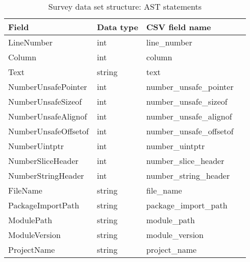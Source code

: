         \begin{table}[h]
            \centering
            \caption{Survey data set structure: AST statements}
            \label{tbl:datastructure-ast-statements}
            \begin{tabular}{llll}
                \toprule
                Field & Data type & CSV field name \\
                \midrule
                LineNumber           & int    & line\_number \\
                Column               & int    & column \\
                Text                 & string & text \\
                NumberUnsafePointer  & int    & number\_unsafe\_pointer \\
                NumberUnsafeSizeof   & int    & number\_unsafe\_sizeof \\
                NumberUnsafeAlignof  & int    & number\_unsafe\_alignof \\
                NumberUnsafeOffsetof & int    & number\_unsafe\_offsetof \\
                NumberUintptr        & int    & number\_uintptr \\
                NumberSliceHeader    & int    & number\_slice\_header \\
                NumberStringHeader   & int    & number\_string\_header \\
                FileName             & string & file\_name \\
                PackageImportPath    & string & package\_import\_path \\
                ModulePath           & string & module\_path \\
                ModuleVersion        & string & module\_version \\
                ProjectName          & string & project\_name \\
                \bottomrule
            \end{tabular}
        \end{table}